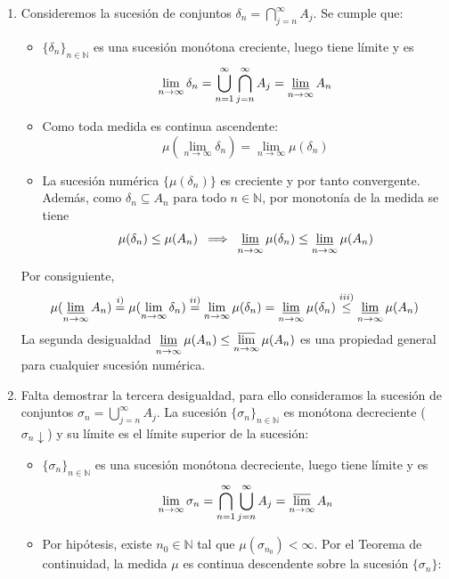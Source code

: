 \begin{demostracion}
\begin{enumerate}[label=\alph*)]
    \item Consideremos la sucesión de conjuntos $\delta_n = \bigcap_{j=n}^\infty A_j$. Se cumple que:
    \begin{itemize}
        \item[i)] $\{\delta_n\}_{n \in \mathbb{N}}$ es una sucesión monótona creciente, luego tiene límite y es
        \[
            \lim_{n \to \infty} \delta_n = \bigcup_{n=1}^\infty \bigcap_{j=n}^\infty A_j = \varliminf_{n \to \infty} A_n
        \]
        \item[ii)] Como toda medida es continua ascendente:
        \[
             \mu\left( \lim_{n \to \infty} \delta_n \right) = \lim_{n \to \infty} \mu(\delta_n)
        \]
        \item[iii)] La sucesión numérica $\{\mu(\delta_n)\}$ es creciente y por tanto convergente. Además, como $\delta_n \subseteq A_n$ para todo $n \in \mathbb{N}$, por monotonía de la medida se tiene 
        \[
            \mu(\delta_n) \le \mu(A_n) \:\implies\:\varliminf_{n \to \infty} \mu(\delta_n) \le \varliminf_{n \to \infty} \mu(A_n)
        \]
    \end{itemize}
    Por consiguiente,
    \[
    \mu(\varliminf_{n \to \infty} A_n) \overset{i)}{=} \mu(\lim_{n \to \infty}\delta_n) \overset{ii)}{=} \lim_{n \to \infty}\mu(\delta_n)=\varliminf_{n \to \infty}\mu(\delta_n) \overset{iii)}{\leq} \varliminf_{n \to \infty}\mu(A_n)
    \]
    La segunda desigualdad $\displaystyle \varliminf_{n \to \infty} \mu(A_n) \le \varlimsup_{n \to \infty} \mu(A_n)$ es una propiedad general para cualquier sucesión numérica.
\newpage
    \item Falta demostrar la tercera desigualdad, para ello consideramos la sucesión de conjuntos $\sigma_n = \bigcup_{j=n}^\infty A_j$. La sucesión $\{\sigma_n\}_{n \in \mathbb{N}}$ es monótona decreciente ($\sigma_n \downarrow$) y su límite es el límite superior de la sucesión:
    \begin{itemize}
        \item[i)] $\{\sigma_n\}_{n \in \mathbb{N}}$ es una sucesión monótona decreciente, luego tiene límite y es
        \[
            \lim_{n \to \infty} \sigma_n = \bigcap_{n=1}^\infty \bigcup_{j=n}^\infty A_j = \varlimsup_{n \to \infty} A_n
        \]
        \item[ii)] Por hipótesis, existe $n_0 \in \mathbb{N}$ tal que $\mu(\sigma_{n_0}) < \infty$. Por el Teorema de continuidad, la medida $\mu$ es continua descendente sobre la sucesión $\{\sigma_n\}$:

\end{itemize}
\end{enumerate}
\end{demostracion}
